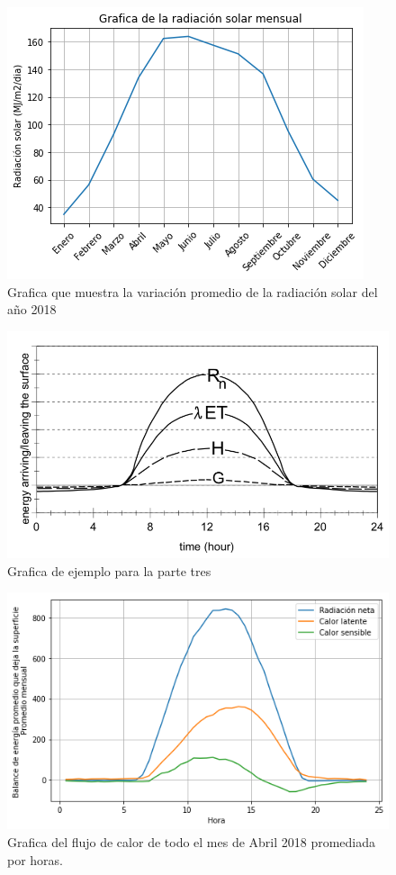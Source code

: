\documentclass[12pt]{article}
\begin{document}
\begin{figure}
    \centering
    \includegraphics[scale = .8]{grafRS.png}
    \caption{Grafica que muestra la variaci\'on promedio de la radiaci\'on solar del año 2018}
    \label{fig:rs}
\end{figure}
\begin{figure}
    \centering
    \includegraphics[scale = .5]{ejemplo.png}
    \caption{Grafica de ejemplo para la parte tres}
    \label{fig:ejemplo}
\end{figure}
\begin{figure}
    \centering
    \includegraphics[scale = .8]{grafFlujo.png}
    \caption{Grafica del flujo de calor de todo el mes de Abril 2018 promediada por horas.}
    \label{fig:flujo}
\end{figure}
\end{document}
